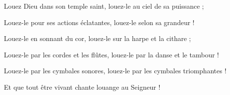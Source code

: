 \item Louez Dieu dans son temple saint,
louez-le au ciel de sa puissance ;

\item Louez-le pour ses actions éclatantes,
louez-le selon sa grandeur !

\item Louez-le en sonnant du cor,
louez-le sur la harpe et la cithare ;

\item Louez-le par les cordes et les flûtes,
louez-le par la danse et le tambour !

\item Louez-le par les cymbales sonores,
louez-le par les cymbales triomphantes !

\item Et que tout être vivant
chante louange au Seigneur !